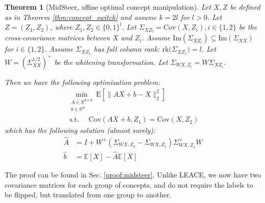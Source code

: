 \documentclass{article}
\theoremstyle{plain}
\newtheorem{theorem}{Theorem}[section]
\theoremstyle{definition}
\theoremstyle{remark}
\newcommand{\cov}{\mathrm{Cov}}
\begin{document}
\begin{theorem}[MidSteer, affine optimal concept manipulation]
    \label{thm:concept_steering}
	Let $X, Z$ be defined as in Theorem \ref{thm:concept_switch} and assume $k = 2l$ for $l > 0$.
    Let $Z = (Z_1, Z_2)$, where $Z_1, Z_2 \in \{0, 1\}^l$. Let $\Sigma_{XZ_i} = \cov(X, Z_i), i \in \{1, 2\}$ be the cross-covariance matrices between $X$ and $Z_i$.
    Assume $\mathrm{Im}(\Sigma_{XZ_i}) \subseteq \mathrm{Im}(\Sigma_{XX})$ for $i \in \{1, 2\}$.
    Assume $\Sigma_{XZ_1}$ has full column rank: $\mathrm{rk}\Big(\Sigma_{XZ_1}\Big) = l$.
    Let $W = (\Sigma_{XX}^{1/2})^{+}$ be the whitening transformation.
    Let $\Sigma_{WX, Z_i} = W\Sigma_{XZ_i}$.
	
	Then we have the following optimization problem:
\begin{align}
	\min_{\substack{
			A \in \mathbb{R}^{d \times d} \\
			b \in \mathbb{R}^d
	}} \mathrm{E}[\big \| AX + b - X \big\|^2_2] \quad \\
	\text{ s.t. } \quad 
	\cov(AX + b, Z_1) = \cov(X, Z_2)
\end{align}
which has the following solution (almost surely):
\begin{align}
    \label{eq:optimal_steering_solution}
	\widehat{A} &= I + W^+ (\Sigma_{WX, Z_2} - \Sigma_{WX, Z_1})\Sigma_{WX, Z_1}^+ W \\
	\widehat{b} &= \mathbb{E}[X] - \widehat{A} \mathbb{E}[X] 
\end{align}
\end{theorem}
The proof can be found in Sec. \ref{proof:midsteer}. Unlike LEACE, we now have two covariance matrices for each group of concepts, and do not require the labels to be flipped, but translated from one group to another.

\end{document}
